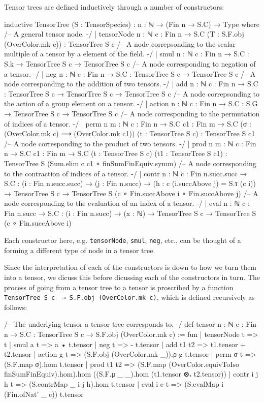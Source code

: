 \documentclass[a4paper, 11pt]{article}
\begin{document}
Tensor trees are defined inductively through a number of constructors: 
\begin{code}
inductive TensorTree (S : TensorSpecies) : {n : ℕ} → (Fin n → S.C) → Type where
  /-- A general tensor node. -/
  | tensorNode {n : ℕ} {c : Fin n → S.C} (T : S.F.obj (OverColor.mk c)) : TensorTree S c
  /-- A node correpsonding to the scalar multiple of a tensor by a element of the field. -/
  | smul {n : ℕ} {c : Fin n → S.C} : S.k → TensorTree S c → TensorTree S c
  /-- A node corresponding to negation of a tensor. -/
  | neg {n : ℕ} {c : Fin n → S.C} : TensorTree S c → TensorTree S c
  /-- A node corresponding to the addition of two tensors. -/
  | add {n : ℕ} {c : Fin n → S.C} : TensorTree S c → TensorTree S c → TensorTree S c
  /-- A node correpsonding to the action of a group element on a tensor. -/
  | action {n : ℕ} {c : Fin n → S.C} : S.G → TensorTree S c → TensorTree S c
  /-- A node corresponding to the permutation of indices of a tensor. -/
  | perm {n m : ℕ} {c : Fin n → S.C} {c1 : Fin m → S.C}
      (σ : (OverColor.mk c) ⟶ (OverColor.mk c1)) (t : TensorTree S c) : TensorTree S c1
  /-- A node corresponding to the product of two tensors. -/
  | prod {n m : ℕ} {c : Fin n → S.C} {c1 : Fin m → S.C}
    (t : TensorTree S c) (t1 : TensorTree S c1) : TensorTree S (Sum.elim c c1 ∘ finSumFinEquiv.symm)
  /-- A node corresponding to the contraction of indices of a tensor. -/
  | contr {n : ℕ} {c : Fin n.succ.succ → S.C} : (i : Fin n.succ.succ) →
    (j : Fin n.succ) → (h : c (i.succAbove j) = S.τ (c i)) → TensorTree S c →
    TensorTree S (c ∘ Fin.succAbove i ∘ Fin.succAbove j)
  /-- A node corresponding to the evaluation of an index of a tensor. -/
  | eval {n : ℕ} {c : Fin n.succ → S.C} : (i : Fin n.succ) → (x : ℕ) → TensorTree S c →
    TensorTree S (c ∘ Fin.succAbove i)
\end{code}
Each constructor here, e.g. \lstinline|tensorNode|, \lstinline|smul|, \lstinline|neg|, etc., can 
be thought of a forming a different type of node in a tensor tree.

Since the interpretation of each of the constructors is down to how we turn them into a tensor,
we dicuss this before dicussing each of the constructors in turn. The process 
of going from a tensor tree to a tensor is proscribed by a function
\lstinline|TensorTree S c  → S.F.obj (OverColor.mk c)|, which is defined recursively as follows: 
\begin{code}
/-- The underlying tensor a tensor tree corresponds to. -/
def tensor {n : ℕ} {c : Fin n → S.C} : TensorTree S c → S.F.obj (OverColor.mk c) := fun
  | tensorNode t => t
  | smul a t => a • t.tensor
  | neg t => - t.tensor
  | add t1 t2 => t1.tensor + t2.tensor
  | action g t => (S.F.obj (OverColor.mk _)).ρ g t.tensor
  | perm σ t => (S.F.map σ).hom t.tensor
  | prod t1 t2 => (S.F.map (OverColor.equivToIso finSumFinEquiv).hom).hom
    ((S.F.μ _ _).hom (t1.tensor ⊗ₜ t2.tensor))
  | contr i j h t => (S.contrMap _ i j h).hom t.tensor
  | eval i e t => (S.evalMap i (Fin.ofNat' _ e)) t.tensor
\end{code}
\end{document}
